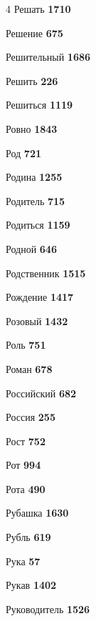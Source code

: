 \begin{multicols}{4}
\noindent Решать \dotfill \textbf{\color{secondary} 1710}\par
\noindent Решение \dotfill \textbf{\color{secondary} 675}\par
\noindent Решительный \dotfill \textbf{\color{secondary} 1686}\par
\noindent Решить \dotfill \textbf{\color{secondary} 226}\par
\noindent Решиться \dotfill \textbf{\color{secondary} 1119}\par
\noindent Ровно \dotfill \textbf{\color{secondary} 1843}\par
\noindent Род \dotfill \textbf{\color{secondary} 721}\par
\noindent Родина \dotfill \textbf{\color{secondary} 1255}\par
\noindent Родитель \dotfill \textbf{\color{secondary} 715}\par
\noindent Родиться \dotfill \textbf{\color{secondary} 1159}\par
\noindent Родной \dotfill \textbf{\color{secondary} 646}\par
\noindent Родственник \dotfill \textbf{\color{secondary} 1515}\par
\noindent Рождение \dotfill \textbf{\color{secondary} 1417}\par
\noindent Розовый \dotfill \textbf{\color{secondary} 1432}\par
\noindent Роль \dotfill \textbf{\color{secondary} 751}\par
\noindent Роман \dotfill \textbf{\color{secondary} 678}\par
\noindent Российский \dotfill \textbf{\color{secondary} 682}\par
\noindent Россия \dotfill \textbf{\color{secondary} 255}\par
\noindent Рост \dotfill \textbf{\color{secondary} 752}\par
\noindent Рот \dotfill \textbf{\color{secondary} 994}\par
\noindent Рота \dotfill \textbf{\color{secondary} 490}\par
\noindent Рубашка \dotfill \textbf{\color{secondary} 1630}\par
\noindent Рубль \dotfill \textbf{\color{secondary} 619}\par
\noindent Рука \dotfill \textbf{\color{secondary} 57}\par
\noindent Рукав \dotfill \textbf{\color{secondary} 1402}\par
\noindent Руководитель \dotfill \textbf{\color{secondary} 1526}\par

\end{multicols}
